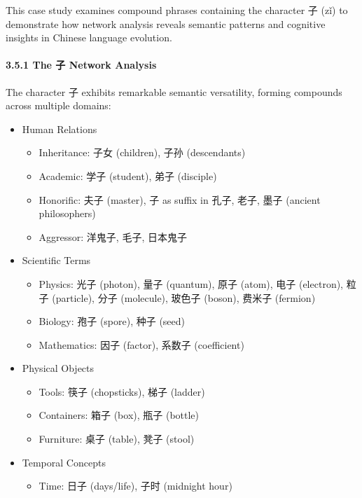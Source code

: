 \documentclass[
]{article}
\providecommand{\tightlist}{%
  \setlength{\itemsep}{0pt}\setlength{\parskip}{0pt}}
\begin{document}
This case study examines compound phrases containing the character 子
(zǐ) to demonstrate how network analysis reveals semantic patterns and
cognitive insights in Chinese language evolution.

\paragraph{3.5.1 The 子 Network
Analysis}\label{the-ux5b50-network-analysis}

The character 子 exhibits remarkable semantic versatility, forming
compounds across multiple domains:

\begin{itemize}
\tightlist
\item
  Human Relations

  \begin{itemize}
  \tightlist
  \item
    Inheritance: 子女 (children), 子孙 (descendants)
  \item
    Academic: 学子 (student), 弟子 (disciple)
  \item
    Honorific: 夫子 (master), 子 as suffix in 孔子, 老子, 墨子 (ancient
    philosophers)
  \item
    Aggressor: 洋鬼子, 毛子, 日本鬼子
  \end{itemize}
\item
  Scientific Terms

  \begin{itemize}
  \tightlist
  \item
    Physics: 光子 (photon), 量子 (quantum), 原子 (atom), 电子
    (electron), 粒子 (particle), 分子 (molecule), 玻色子 (boson), 费米子
    (fermion)
  \item
    Biology: 孢子 (spore), 种子 (seed)
  \item
    Mathematics: 因子 (factor), 系数子 (coefficient)
  \end{itemize}
\item
  Physical Objects

  \begin{itemize}
  \tightlist
  \item
    Tools: 筷子 (chopsticks), 梯子 (ladder)
  \item
    Containers: 箱子 (box), 瓶子 (bottle)
  \item
    Furniture: 桌子 (table), 凳子 (stool)
  \end{itemize}
\item
  Temporal Concepts

  \begin{itemize}
  \tightlist
  \item
    Time: 日子 (days/life), 子时 (midnight hour)
  \end{itemize}
\end{itemize}
\end{document}
